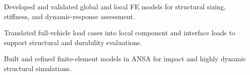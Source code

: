 \vspace{1em}
\begin{cvitems}
  \item Developed and validated global and local FE models for structural sizing, stiffness, and dynamic-response assessment.
  \item Translated full-vehicle load cases into local component and interface loads to support structural and durability evaluations.
\end{cvitems}

\vspace{1em}
\begin{cvitems}
  \item Built and refined finite-element models in ANSA for impact and highly dynamic structural simulations.
\end{cvitems}
